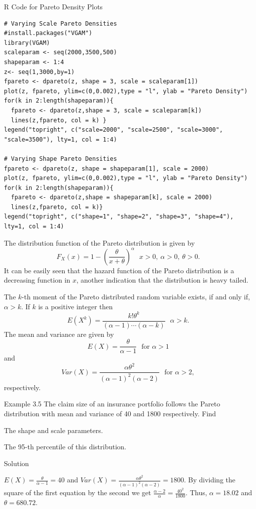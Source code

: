 \documentclass[]{book}
\begin{document}
R Code for Pareto Density Plots

\hypertarget{display.Paretoscale.2}{}
\begin{verbatim}
# Varying Scale Pareto Densities
#install.packages("VGAM")
library(VGAM)
scaleparam <- seq(2000,3500,500)
shapeparam <- 1:4
z<- seq(1,3000,by=1)
fpareto <- dpareto(z, shape = 3, scale = scaleparam[1])
plot(z, fpareto, ylim=c(0,0.002),type = "l", ylab = "Pareto Density")
for(k in 2:length(shapeparam)){
  fpareto <- dpareto(z,shape = 3, scale = scaleparam[k])
  lines(z,fpareto, col = k) }
legend("topright", c("scale=2000", "scale=2500", "scale=3000", "scale=3500"), lty=1, col = 1:4)

# Varying Shape Pareto Densities
fpareto <- dpareto(z, shape = shapeparam[1], scale = 2000)
plot(z, fpareto, ylim=c(0,0.002),type = "l", ylab = "Pareto Density")
for(k in 2:length(shapeparam)){
  fpareto <- dpareto(z,shape = shapeparam[k], scale = 2000)
  lines(z,fpareto, col = k)}
legend("topright", c("shape=1", "shape=2", "shape=3", "shape=4"), lty=1, col = 1:4)
\end{verbatim}

The distribution function of the Pareto distribution is given by
\[F_{X}\left( x \right) = 1 - \left( \frac{\theta}{x + \theta} \right)^{\alpha}  \ \ \ x > 0,\ \alpha > 0,\ \theta > 0.\]
It can be easily seen that the hazard function of the Pareto
distribution is a decreasing function in \(x\), another indication that
the distribution is heavy tailed.

The \(k\)-th moment of the Pareto distributed random variable exists, if
and only if, \(\alpha > k\). If \(k\) is a positive integer then
\[E\left( X^{k} \right) = \frac{k!\theta^{k}}{\left( \alpha - 1 \right)\cdots\left( \alpha - k \right)} \ \ \ \alpha > k.\]
The mean and variance are given by
\[E\left( X \right) = \frac{\theta}{\alpha - 1} \ \ \ \text{for } \alpha > 1\]
and
\[Var\left( X \right) = \frac{\alpha\theta^{2}}{\left( \alpha - 1 \right)^{2}\left( \alpha - 2 \right)} \ \ \ \text{for } \alpha > 2,\]respectively.

Example 3.5 The claim size of an insurance portfolio follows the Pareto
distribution with mean and variance of 40 and 1800 respectively. Find

The shape and scale parameters.

The 95-th percentile of this distribution.

Solution

\(E\left( X \right) = \frac{\theta}{\alpha - 1} = 40\) and
\(Var\left( X \right) = \frac{\alpha\theta^{2}}{\left( \alpha - 1 \right)^{2}\left( \alpha - 2 \right)} = 1800\).
By dividing the square of the first equation by the second we get
\(\frac{\alpha - 2}{\alpha} = \frac{40^{2}}{1800}\). Thus,
\(\alpha = 18.02\) and \(\theta = 680.72\).
\end{document}
